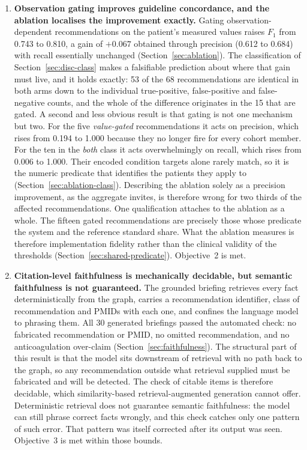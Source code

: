 \begin{enumerate}
    \item \textbf{Observation gating improves guideline concordance, and the ablation
    localises the improvement exactly.} Gating observation-dependent recommendations on the
    patient's measured values raises $F_1$ from 0.743 to
    0.810, a gain of $+0.067$ obtained through precision
    (0.612 to 0.684) with recall essentially unchanged
    (Section~\ref{sec:ablation}). The classification of Section~\ref{sec:disc-class} makes a
    falsifiable prediction about where that gain must live, and it holds exactly: 53 of the
    68 recommendations are identical in both arms down to the individual true-positive,
    false-positive and false-negative counts, and the whole of the difference originates in
    the 15 that are gated. A second and less obvious result is that gating is not one
    mechanism but two. For the five \emph{value-gated} recommendations it acts on precision, which rises from 0.194
    to 1.000 because they no longer fire for every cohort member. For the ten in the
    \emph{both} class it acts overwhelmingly on recall, which rises from 0.006 to 1.000.
    Their encoded condition targets alone rarely match, so it is the numeric predicate that
    identifies the patients they apply to (Section~\ref{sec:ablation-class}). Describing the ablation solely as a precision
    improvement, as the aggregate invites, is therefore wrong for two thirds of the affected
    recommendations. One qualification attaches to the ablation as a whole. The fifteen gated recommendations are
    precisely those whose predicate the system and the reference standard share. What the
    ablation measures is therefore implementation fidelity rather than the clinical validity
    of the thresholds (Section~\ref{sec:shared-predicate}). Objective~2 is met.

    \item \textbf{Citation-level faithfulness is mechanically decidable, but semantic
    faithfulness is not guaranteed.} The grounded briefing retrieves every fact
    deterministically from the graph, carries a recommendation identifier, class of
    recommendation and PMIDs with each one, and confines the language model to phrasing them.
    All 30 generated briefings passed the automated check: no fabricated recommendation or
    PMID, no omitted recommendation, and no anticoagulation over-claim
    (Section~\ref{sec:faithfulness}). The structural part of this result is that the model
    sits downstream of retrieval with no path back to the graph, so any recommendation outside
    what retrieval supplied must be fabricated and will be detected. The check of citable items
    is therefore decidable, which similarity-based retrieval-augmented generation cannot offer.
    Deterministic retrieval does not guarantee semantic faithfulness: the model can still
    phrase correct facts wrongly, and this check catches only one pattern of such error. That
    pattern was itself corrected after its output was seen. Objective~3 is met within those
    bounds.
\end{enumerate}

